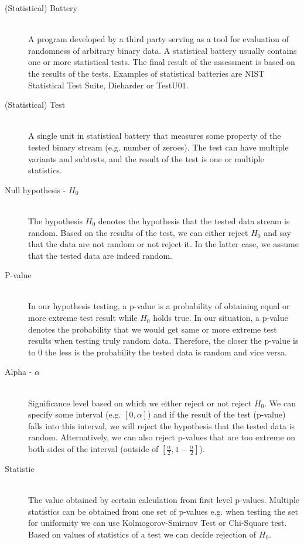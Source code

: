\documentclass[
  digital,  	%
  color,		%
  oneside,   	%
  12pt,
  nocover,
  notable,
  nolof,
  nolot,
]{fithesis3}
\begin{document}
\begin{description}
\item[(Statistical) Battery] \hfill \\
A program developed by a third party serving as a tool for evaluation of randomness of arbitrary binary data. A statistical battery usually contains one or more statistical tests. The final result of the assessment is based on the results of the tests. Examples of statistical batteries are NIST Statistical Test Suite, Dieharder or TestU01.

\item[(Statistical) Test] \hfill \\
A single unit in statistical battery that measures some property of the tested binary stream (e.g. number of zeroes). The test can have multiple variants and subtests, and the result of the test is one or multiple statistics.

\item[Null hypothesis - $H_0$] \hfill \\
The hypothesis $H_0$ denotes the hypothesis that the tested data stream is random. Based on the results of the test, we can either reject $H_0$ and say that the data are not random or not reject it. In the latter case, we assume that the tested data are indeed random.

\item[P-value] \hfill \\
In our hypothesis testing, a p-value is a probability of obtaining equal or more extreme test result while $H_0$ holds true. In our situation, a p-value denotes the probability that we would get same or more extreme test results when testing truly random data. Therefore, the closer the p-value is to 0 the less is the probability the tested data is random and vice versa.

\item[Alpha - $\alpha$] \hfill \\
Significance level based on which we either reject or not reject $H_0$. We can specify some interval (e.g. $[0,\alpha]$) and if the result of the test (p-value) falls into this interval, we will reject the hypothesis that the tested data is random. Alternatively, we can also reject p-values that are too extreme on both sides of the interval (outside of $\left[\frac{\alpha}{2},1-\frac{\alpha}{2}\right]$).

\item[Statistic] \hfill \\
The value obtained by certain calculation from first level p-values. Multiple statistics can be obtained from one set of p-values e.g. when testing the set for uniformity we can use Kolmogorov-Smirnov Test or Chi-Square test. Based on values of statistics of a test we can decide rejection of $H_0$.


\end{description}
\end{document}
